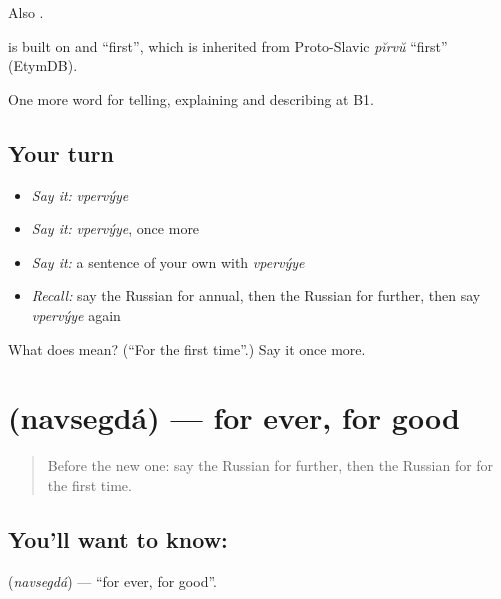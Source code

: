 Also \emph{  }.

\begin{cousinweb}
\emph{} is built on \emph{} and \emph{} \textquotedblleft{}first\textquotedblright{}, which is inherited from Proto-Slavic \emph{pĭrvŭ} \textquotedblleft{}first\textquotedblright{} (EtymDB).
\end{cousinweb}

\begin{grammarlens}[title={What you've built}]
One more word for telling, explaining and describing at B1.
\end{grammarlens}

\subsection*{Your turn}
\begin{itemize}
\raggedright
  \item \emph{Say it:} \emph{vpervýye}
  \item \emph{Say it:} \emph{vpervýye}, once more
  \item \emph{Say it:} a sentence of your own with \emph{vpervýye}
  \item \emph{Recall:} say the Russian for annual, then the Russian for further, then say \emph{vpervýye} again
\end{itemize}

\begin{tcolorbox}[breakable,colback=teal!4,colframe=teal!35!black,title={Before you move on}]
What does  mean? (\textquotedblleft{}For the first time\textquotedblright{}.) Say it once more.
\end{tcolorbox}
\section[\texorpdfstring{\ru{навсегда} (navsegdá)}{навсегда (navsegdá)}]{ (navsegdá) — for ever, for good}

\label{lesson:RU-C278-navsegda}



\begin{quote}
Before the new one: say the Russian for further, then the Russian for for the first time.
\end{quote}

\subsection*{You'll want to know: }
\textbf{} (\emph{navsegdá}) — \textquotedblleft{}for ever, for good\textquotedblright{}.

